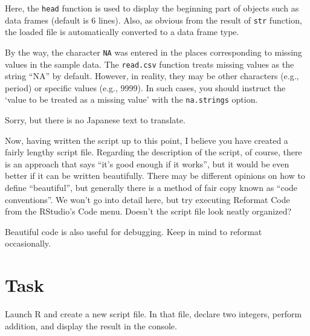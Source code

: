 \documentclass[
  a4paper,
]{book}
\begin{document}
Here, the \texttt{head} function is used to display the beginning part
of objects such as data frames (default is 6 lines). Also, as obvious
from the result of \texttt{str} function, the loaded file is
automatically converted to a data frame type.

By the way, the character \texttt{NA} was entered in the places
corresponding to missing values \hspace{0pt}\hspace{0pt}in the sample
data. The \texttt{read.csv} function treats missing values
\hspace{0pt}\hspace{0pt}as the string ``NA'' by default. However, in
reality, they may be other characters (e.g., period) or specific values
\hspace{0pt}\hspace{0pt}(e.g., 9999). In such cases, you should instruct
the `value to be treated as a missing value' with the
\texttt{na.strings} option.

Sorry, but there is no Japanese text to translate.

Now, having written the script up to this point, I believe you have
created a fairly lengthy script file. Regarding the description of the
script, of course, there is an approach that says ``it's good enough if
it works'', but it would be even better if it can be written
beautifully. There may be different opinions on how to define
``beautiful'', but generally there is a method of fair copy known as
``code conventions''. We won't go into detail here, but try executing
Reformat Code from the RStudio's Code menu. Doesn't the script file look
neatly organized?

Beautiful code is also useful for debugging. Keep in mind to reformat
occasionally.

\section{Task}\label{task}

Launch R and create a new script file. In that file, declare two
integers, perform addition, and display the result in the console.
\end{document}

